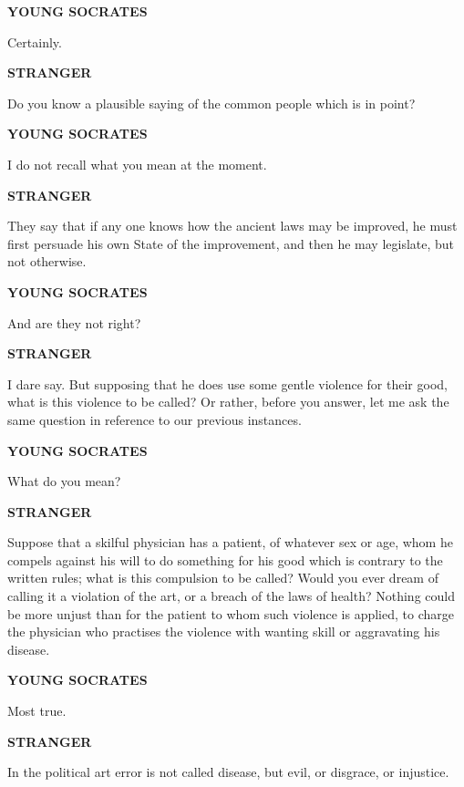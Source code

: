 \documentclass[11pt,letter]{article}
\begin{document}
\par \textbf{YOUNG SOCRATES}
\par   Certainly.

\par \textbf{STRANGER}
\par   Do you know a plausible saying of the common people which is in point?

\par \textbf{YOUNG SOCRATES}
\par   I do not recall what you mean at the moment.

\par \textbf{STRANGER}
\par   They say that if any one knows how the ancient laws may be improved, he must first persuade his own State of the improvement, and then he may legislate, but not otherwise.

\par \textbf{YOUNG SOCRATES}
\par   And are they not right?

\par \textbf{STRANGER}
\par   I dare say. But supposing that he does use some gentle violence for their good, what is this violence to be called? Or rather, before you answer, let me ask the same question in reference to our previous instances.

\par \textbf{YOUNG SOCRATES}
\par   What do you mean?

\par \textbf{STRANGER}
\par   Suppose that a skilful physician has a patient, of whatever sex or age, whom he compels against his will to do something for his good which is contrary to the written rules; what is this compulsion to be called? Would you ever dream of calling it a violation of the art, or a breach of the laws of health? Nothing could be more unjust than for the patient to whom such violence is applied, to charge the physician who practises the violence with wanting skill or aggravating his disease.

\par \textbf{YOUNG SOCRATES}
\par   Most true.

\par \textbf{STRANGER}
\par   In the political art error is not called disease, but evil, or disgrace, or injustice.
\end{document}
